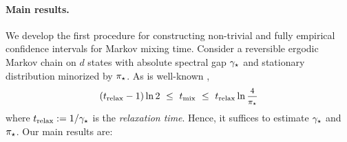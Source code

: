 \paragraph{Main results.}
We develop the first procedure for constructing non-trivial
and fully empirical confidence intervals for Markov mixing time.
Consider a reversible ergodic Markov chain on $d$ states with absolute
spectral gap $\gamma_{\star}$ and stationary distribution minorized by $\pi_{\star}$. 
As is well-known \citep[Theorems~12.3 and~12.4]{LePeWi08},
\begin{equation}
  \label{eq:mixing-time-bound}
  \Parens{\trelax - 1} \ln2
  \ \leq \ \tmix
  \ \leq \ \trelax \ln \mfrac4{\pimin}
\end{equation}
where $t_{\operatorname{relax}} := 1/\gamma_{\star}$ is the \emph{relaxation time}.
Hence, it suffices to estimate $\gamma_{\star}$ and $\pi_{\star}$. 
Our main results are:
